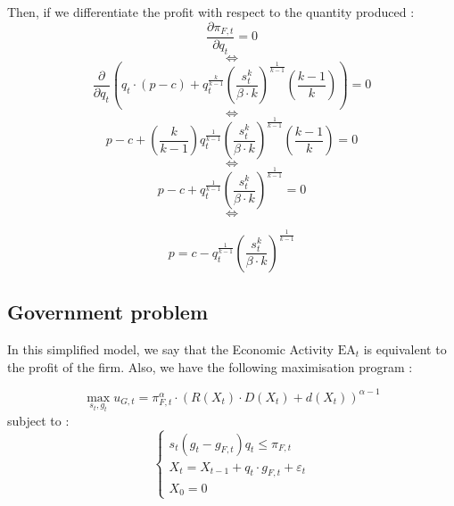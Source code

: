 \documentclass{article}
\begin{document}
Then, if we differentiate the profit with respect to the quantity produced :
$$\frac{\partial \pi_{F,t}}{\partial q_{t}}=0$$
$$\iff$$
$$\frac{\partial}{\partial q_{t}}\left(q_{t}\cdot\left(p-c\right)+q_{t}^{\frac{k}{k-1}}\left(\frac{s_{t}^{k}}{\beta\cdot k}\right)^{\frac{1}{k-1}}\left(\frac{k-1}{k}\right)\right)=0$$
$$\iff$$
$$p-c+\left(\frac{k}{k-1}\right)q_{t}^{\frac{1}{k-1}}\left(\frac{s_{t}^{k}}{\beta\cdot k}\right)^{\frac{1}{k-1}}\left(\frac{k-1}{k}\right)=0$$
$$\iff$$
$$p-c+q_{t}^{\frac{1}{k-1}}\left(\frac{s_{t}^{k}}{\beta\cdot k}\right)^{\frac{1}{k-1}}=0$$
$$\iff$$

\begin{equation}
    p=c-q_{t}^{\frac{1}{k-1}}\left(\frac{s_{t}^{k}}{\beta\cdot k}\right)^{\frac{1}{k-1}}
\end{equation}

\subsection{Government problem}

In this simplified model, we say that the Economic Activity $\text{EA}_{t}$ is equivalent to the profit of the firm. Also, we have the following maximisation program : 

$$\max_{s_{t},g_{t}}{u_{G,t}=\pi_{F,t}^\alpha\cdot\left(R(X_{t})\cdot D(X_{t})+d(X_{t})\right)^{\alpha-1}}$$
subject to : 
\begin{equation*}
    \begin{cases}
        s_{t}\left(g_{t}-g_{F,t}\right) q_{t} \le \pi_{F,t} \\
        X_t=X_{t-1}+q_{t}\cdot g_{F,t}+\varepsilon_{t} \\
        X_0=0
    \end{cases}
\end{equation*}
\end{document}

